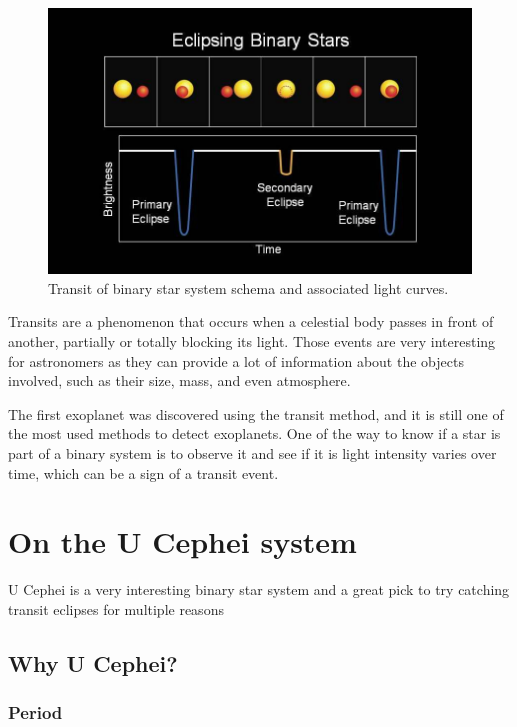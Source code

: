 \documentclass[12pt,a4paper]{article}
\begin{document}
\begin{figure}[H]
    \centering
    \includegraphics[width=1\textwidth]{assets/star-transits.jpg}
    \caption{Transit of binary star system schema and associated light curves. \cite{VariableStar}}
    \label{fig:transits}
\end{figure}


Transits are a phenomenon that occurs when a celestial body passes in front of another, partially or totally blocking its light.
Those events are very interesting for astronomers as they can provide a lot of information about the objects involved, such as their size, mass, and even atmosphere.

The first exoplanet was discovered using the transit method, and it is still one of the most used methods to detect exoplanets.
One of the way to know if a star is part of a binary system is to observe it and see if it is light intensity varies over time, which can be a sign of a transit event.

\section{On the U Cephei system}

U Cephei is a very interesting binary star system and a great pick to try catching transit eclipses for multiple reasons

\subsection{Why U Cephei?}

\subsubsection{Period}
\end{document}

